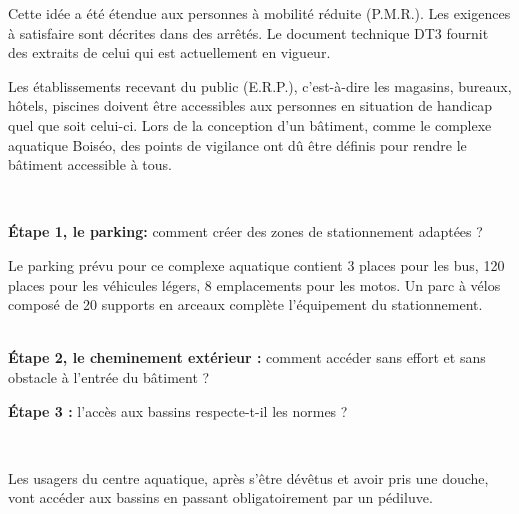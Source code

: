 Cette idée a été étendue aux personnes à mobilité réduite (P.M.R.). Les exigences à satisfaire sont décrites dans des arrêtés. Le document technique DT3 fournit des extraits de celui qui est actuellement en vigueur.

Les établissements recevant du public (E.R.P.), c'est-à-dire les magasins, bureaux, hôtels, piscines doivent être accessibles aux personnes en situation de handicap quel que soit celui-ci. Lors de la conception d'un bâtiment, comme le complexe aquatique Boiséo, des points de vigilance ont dû être définis pour rendre le bâtiment accessible à tous.

~\

\textbf{Étape 1, le parking:} comment créer des zones de stationnement adaptées ?

Le parking prévu pour ce complexe aquatique contient 3 places pour les bus, 120 places pour les véhicules légers, 8 emplacements pour les motos. Un parc à vélos composé de 20 supports en arceaux complète l'équipement du stationnement.





~\ \\

\textbf{Étape 2, le cheminement extérieur :} comment accéder sans effort et sans obstacle à l'entrée du bâtiment ?


\textbf{Étape 3 :} l'accès aux bassins respecte-t-il les normes ?

~\

Les usagers du centre aquatique, après s'être dévêtus et avoir pris une douche, vont accéder aux bassins en passant obligatoirement par un pédiluve.

